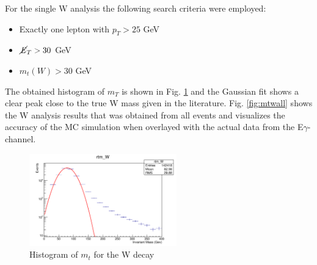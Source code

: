 \documentclass[runningheads,a4paper]{llncs}
\begin{document}
For the single W analysis the following search criteria were employed:
\begin{itemize}
\item Exactly one lepton with ${p}_{T} > 25$ GeV
\item $\cancel{\it{E}}_{T} > 30$ GeV 
\item ${m}_{t}(W) > 30$ GeV
\end{itemize}

The obtained histogram of ${m}_{T}$ is shown in Fig. \ref{fig:mtw} and the Gaussian fit shows a clear peak close to the true W mass given in the literature. Fig. \ref{fig:mtwall} shows the W analysis results that was obtained from all events and visualizes the accuracy of the MC simulation when overlayed with the actual data from the E$\gamma$-channel.\\

\begin{figure}
\centering
\includegraphics[height=4cm]{W_rtm_fit}
\caption{Histogram of ${m}_{t}$ for the W decay}
\label{fig:mtw}
\end{figure}
\end{document}
